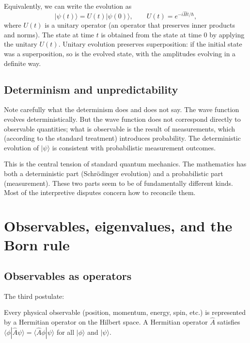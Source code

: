 Equivalently, we can write the evolution as
\[
    |\psi(t)\rangle = U(t) |\psi(0)\rangle, \qquad U(t) = e^{-i\hat{H}t/\hbar},
\]
where $U(t)$ is a unitary operator (an operator that preserves inner
products and norms). The state at time $t$ is obtained from the
state at time 0 by applying the unitary $U(t)$. Unitary evolution
preserves superposition: if the initial state was a superposition,
so is the evolved state, with the amplitudes evolving in a definite
way.

\subsection{Determinism and unpredictability}

Note carefully what the determinism does and does not say. The wave
function evolves deterministically. But the wave function does not
correspond directly to observable quantities; what is observable is
the result of measurements, which (according to the standard
treatment) introduces probability. The deterministic evolution of
$|\psi\rangle$ is consistent with probabilistic measurement
outcomes.

This is the central tension of standard quantum mechanics. The
mathematics has both a deterministic part (Schr\"odinger evolution)
and a probabilistic part (measurement). These two parts seem to be
of fundamentally different kinds. Most of the interpretive disputes
concern how to reconcile them.

\section{Observables, eigenvalues, and the Born rule}
\label{sec:born-rule}

\subsection{Observables as operators}

The third postulate:

\begin{principlebox}
Every physical observable (position, momentum, energy, spin, etc.)
is represented by a Hermitian operator on the Hilbert space. A
Hermitian operator $\hat{A}$ satisfies $\langle\phi | \hat{A} \psi
\rangle = \langle \hat{A}\phi | \psi\rangle$ for all $|\phi\rangle$
and $|\psi\rangle$.
\end{principlebox}

